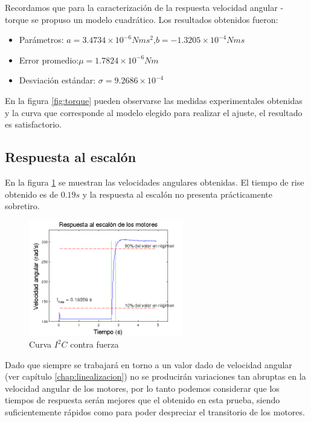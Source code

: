 \documentclass[main]{subfiles}
\begin{document}
Recordamos que para la caracterizaci\'on de la respuesta velocidad angular - torque se propuso un modelo cuadr\'atico. Los resultados obtenidos fueron:

\begin{itemize}
 \item Par\'ametros: \newline$a=3.4734\times10^{-6}Nms^2$,\newline$b=-1.3205\times 10 ^{-4} Nms$
\item Error promedio:\newline$\mu = 1.7824\times 10^{-6}Nm$
\item Desviaci\'on est\'andar: \newline$\sigma = 9.2686\times 10^{-4}$ 
\end{itemize}

En la figura \ref{fig:torque} pueden observarse las medidas experimentales obtenidas y la curva que corresponde al modelo elegido para realizar el ajuste, el resultado es satisfactorio.

\subsection{Respuesta al escal\'on}

En la figura \ref{fig:resp_esc} se muestran las velocidades angulares obtenidas. El tiempo de rise obtenido es de $0.19s$ y la respuesta al escal\'on no presenta pr\'acticamente sobretiro.

\begin{figure}
\vspace{-25pt}
  \begin{center}
	\includegraphics[width=0.6\textwidth]{./pics_motores/resp_esc.png}
  \caption{Curva $I^2C$ contra fuerza}
  \end{center}
  \label{fig:resp_esc}
\end{figure}

Dado que siempre se trabajar\'a en torno a un valor dado de velocidad angular (ver cap\'itulo \ref{chap:linealizacion}) no se producir\'an variaciones tan abruptas en la velocidad angular de los motores, por lo tanto podemos considerar que los tiempos de respuesta ser\'an mejores que el obtenido en esta prueba, siendo suficientemente r\'apidos como para poder despreciar el transitorio de los motores.
\end{document}
